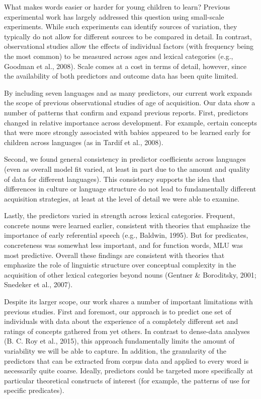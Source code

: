 \documentclass[10pt, letterpaper]{article}
\begin{document}
What makes words easier or harder for young children to learn? Previous
experimental work has largely addressed this question using small-scale
experiments. While such experiments can identify sources of variation,
they typically do not allow for different sources to be compared in
detail. In contrast, observational studies allow the effects of
individual factors (with frequency being the most common) to be measured
across ages and lexical categories (e.g., Goodman et al., 2008). Scale
comes at a cost in terms of detail, however, since the availability of
both predictors and outcome data has been quite limited.

By including seven languages and as many predictors, our current work
expands the scope of previous observational studies of age of
acquisition. Our data show a number of patterns that confirm and expand
previous reports. First, predictors changed in relative importance
across development. For example, certain concepts that were more
strongly associated with babies appeared to be learned early for
children across languages (as in Tardif et al., 2008).

Second, we found general consistency in predictor coefficients across
languages (even as overall model fit varied, at least in part due to the
amount and quality of data for different languages). This consistency
supports the idea that differences in culture or language structure do
not lead to fundamentally different acquisition strategies, at least at
the level of detail we were able to examine.

Lastly, the predictors varied in strength across lexical categories.
Frequent, concrete nouns were learned earlier, consistent with theories
that emphasize the importance of early referential speech (e.g.,
Baldwin, 1995). But for predicates, concreteness was somewhat less
important, and for function words, MLU was most predictive. Overall
these findings are consistent with theories that emphasize the role of
linguistic structure over conceptual complexity in the acquisition of
other lexical categories beyond nouns (Gentner \& Boroditsky, 2001;
Snedeker et al., 2007).

Despite its larger scope, our work shares a number of important
limitations with previous studies. First and foremost, our approach is
to predict one set of individuals with data about the experience of a
completely different set and ratings of concepts gathered from yet
others. In contrast to dense-data analyses (B. C. Roy et al., 2015),
this approach fundamentally limits the amount of variability we will be
able to capture. In addition, the granularity of the predictors that can
be extracted from corpus data and applied to every word is necessarily
quite coarse. Ideally, predictors could be targeted more specifically at
particular theoretical constructs of interest (for example, the patterns
of use for specific predicates).
\end{document}
